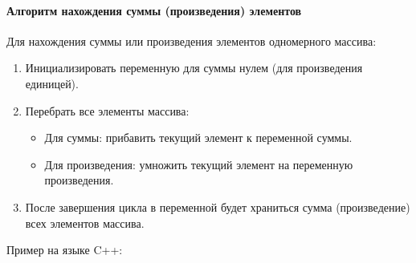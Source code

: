 \documentclass[
]{article}
\providecommand{\tightlist}{%
  \setlength{\itemsep}{0pt}\setlength{\parskip}{0pt}}
\begin{document}
\paragraph{Алгоритм нахождения суммы (произведения)
элементов}\label{ux430ux43bux433ux43eux440ux438ux442ux43c-ux43dux430ux445ux43eux436ux434ux435ux43dux438ux44f-ux441ux443ux43cux43cux44b-ux43fux440ux43eux438ux437ux432ux435ux434ux435ux43dux438ux44f-ux44dux43bux435ux43cux435ux43dux442ux43eux432}

Для нахождения суммы или произведения элементов одномерного массива:

\begin{enumerate}
\def\labelenumi{\arabic{enumi}.}
\tightlist
\item
  Инициализировать переменную для суммы нулем (для произведения
  единицей).
\item
  Перебрать все элементы массива:

  \begin{itemize}
  \tightlist
  \item
    Для суммы: прибавить текущий элемент к переменной суммы.
  \item
    Для произведения: умножить текущий элемент на переменную
    произведения.
  \end{itemize}
\item
  После завершения цикла в переменной будет храниться сумма
  (произведение) всех элементов массива.
\end{enumerate}

Пример на языке C++:
\end{document}

